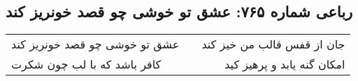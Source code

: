 \begin{center}
\section*{رباعی شماره ۷۶۵: عشق تو خوشی چو قصد خونریز کند}
\label{sec:0765}
\begin{longtable}{l p{0.5cm} r}
عشق تو خوشی چو قصد خونریز کند
&&
جان از قفس قالب من خیز کند
\\
کافر باشد که با لب چون شکرت
&&
امکان گنه یابد و پرهیز کید
\\
\end{longtable}
\end{center}
